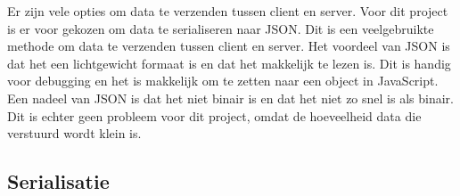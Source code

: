Er zijn vele opties om data te verzenden tussen client en server.
Voor dit project is er voor gekozen om data te serialiseren naar JSON.
Dit is een veelgebruikte methode om data te verzenden tussen client en server.
Het voordeel van JSON is dat het een lichtgewicht formaat is en dat het makkelijk te lezen is.
Dit is handig voor debugging en het is makkelijk om te zetten naar een object in JavaScript.
Een nadeel van JSON is dat het niet binair is en dat het niet zo snel is als binair.
Dit is echter geen probleem voor dit project, omdat de hoeveelheid data die verstuurd wordt klein is.
\subsection{Serialisatie}
\label{sec:serialisatie}

